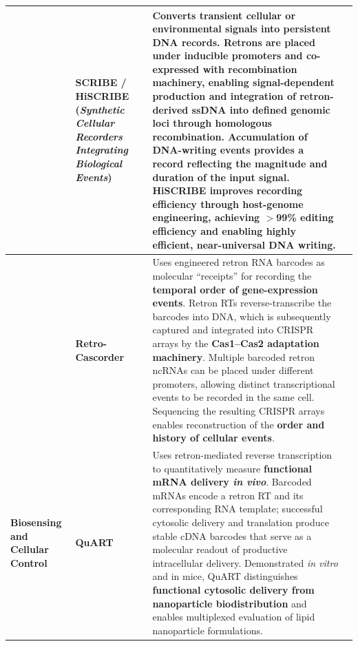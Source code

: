 \begin{table}[H]
\begin{tabularx}{\textwidth}{
    >{\raggedright\arraybackslash}p{}
    >{\raggedright\arraybackslash}p{}
    X
    >{\centering\arraybackslash}p{}
}
\multirow{2}{*}{%
    \parbox{0.17\textwidth}{\raggedright\textbf{Recording of\\ Molecular Events}}
}
&
\textbf{SCRIBE / HiSCRIBE}
(\textit{Synthetic Cellular Recorders Integrating Biological Events})
&
Converts transient cellular or environmental signals into \textbf{persistent DNA records}. Retrons are placed under inducible promoters and co-expressed with recombination machinery, enabling signal-dependent production and integration of retron-derived ssDNA into defined genomic loci through homologous recombination. Accumulation of DNA-writing events provides a record reflecting the \textbf{magnitude and duration of the input signal}. HiSCRIBE improves recording efficiency through host-genome engineering, achieving \textbf{$>$99\% editing efficiency} and enabling highly efficient, near-universal DNA writing.
&
\cite{farzadfard2014scribe, farzadfard2021hiscribe}
\\
\cline{2-4}
&
\textbf{Retro-Cascorder}
&
Uses engineered retron RNA barcodes as molecular ``receipts'' for recording the \textbf{temporal order of gene-expression events}. Retron RTs reverse-transcribe the barcodes into DNA, which is subsequently captured and integrated into CRISPR arrays by the \textbf{Cas1--Cas2 adaptation machinery}. Multiple barcoded retron ncRNAs can be placed under different promoters, allowing distinct transcriptional events to be recorded in the same cell. Sequencing the resulting CRISPR arrays enables reconstruction of the \textbf{order and history of cellular events}.
&
\cite{bhattarai2022retrocascorder}
\\
\midrule

\textbf{Biosensing and Cellular Control}
&
\textbf{QuART}
&
Uses retron-mediated reverse transcription to quantitatively measure \textbf{functional mRNA delivery \textit{in vivo}}. Barcoded mRNAs encode a retron RT and its corresponding RNA template; successful cytosolic delivery and translation produce stable cDNA barcodes that serve as a molecular readout of productive intracellular delivery. Demonstrated \textit{in vitro} and in mice, QuART distinguishes \textbf{functional cytosolic delivery from nanoparticle biodistribution} and enables multiplexed evaluation of lipid nanoparticle formulations.
&
\cite{wang2025quart}
\\

\bottomrule
\end{tabularx}
\end{table}


